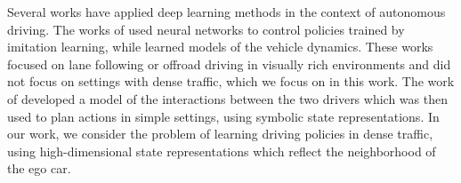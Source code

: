 \documentclass{article} %
\begin{document}
Several works have applied deep learning methods in the context of autonomous driving. The works of \citep{Pomerleau91, Muller2006, Bojarski16, Pan17} used neural networks to control policies trained by imitation learning, while \citep{Williams2017} learned models of the vehicle dynamics. These works focused on lane following or offroad driving in visually rich environments and did not focus on settings with dense traffic, which we focus on in this work. The work of \citep{Sadigh16} developed a model of the interactions between the two drivers which was then used to plan actions in simple settings, using symbolic state representations. In our work, we consider the problem of learning driving policies in dense traffic, using high-dimensional state representations which reflect the neighborhood of the ego car. %



\end{document}
